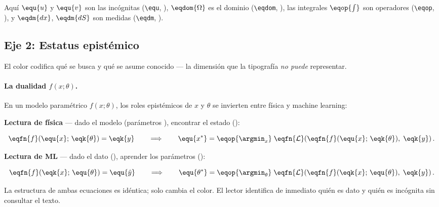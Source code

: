 Aquí $\equ{u}$ y $\equ{v}$ son las incógnitas (\texttt{\textbackslash equ}, ),
$\eqdom{\Omega}$ es el dominio (\texttt{\textbackslash eqdom}, ),
las integrales $\eqop{\int}$ son operadores (\texttt{\textbackslash eqop}, ),
y $\eqdm{dx}$, $\eqdm{dS}$ son medidas (\texttt{\textbackslash eqdm}, ).

\subsection{Eje 2: Estatus epistémico}

El color codifica qué se busca y qué se asume conocido --- la dimensión que
la tipografía \textit{no puede} representar.

\paragraph{La dualidad $f(x;\theta)$.}
En un modelo paramétrico $f(x;\theta)$, los roles epistémicos de $x$ y
$\theta$ se invierten entre física y machine learning:

\medskip
\textbf{Lectura de física} --- dado el modelo (parámetros ),
encontrar el estado ():

\begin{equation}
\label{eq:physics-reading}
\eqfn{f}\!\left(\equ{x};\, \eqk{\theta}\right)
= \eqk{y}
\qquad\Longrightarrow\qquad
\equ{x^*} = \eqop{\argmin_{x}} \;
\eqfn{\mathcal{L}}\!\left(\eqfn{f}(\equ{x};\,\eqk{\theta}),\; \eqk{y}\right).
\end{equation}

\textbf{Lectura de ML} --- dado el dato (), aprender los
parámetros ():

\begin{equation}
\label{eq:ml-reading}
\eqfn{f}\!\left(\eqk{x};\, \equ{\theta}\right)
= \equ{\hat{y}}
\qquad\Longrightarrow\qquad
\equ{\theta^*} = \eqop{\argmin_{\theta}} \;
\eqfn{\mathcal{L}}\!\left(\eqfn{f}(\eqk{x};\,\equ{\theta}),\; \eqk{y}\right).
\end{equation}

La estructura de ambas ecuaciones es idéntica; solo cambia el color.
El lector identifica de inmediato quién es dato y quién es incógnita sin
consultar el texto.


